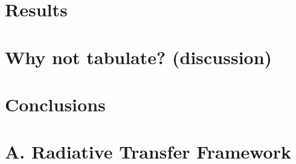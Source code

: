 \documentclass[preprint2]{aastex}              %
\begin{document}
\section{Results}




\section{Why not tabulate? (discussion)}



\section{Conclusions}






\appendix

\section{A. Radiative Transfer Framework}
\end{document}
